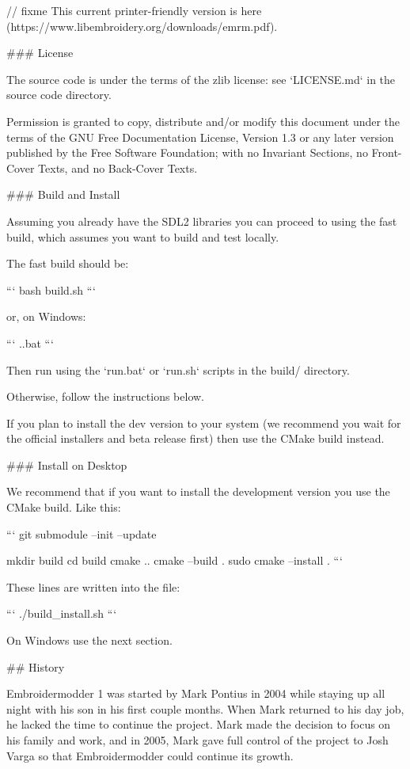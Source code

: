 // fixme
This current printer-friendly version
is here (https://www.libembroidery.org/downloads/emrm.pdf).

### License

The source code is under the terms of the zlib license: see `LICENSE.md`
in the source code directory.

Permission is granted to copy, distribute and/or modify this document
under the terms of the GNU Free Documentation License, Version 1.3
or any later version published by the Free Software Foundation;
with no Invariant Sections, no Front-Cover Texts, and no Back-Cover Texts.


### Build and Install

Assuming you already have the SDL2 libraries you can proceed to using the fast build, which
assumes you want to build and test locally.

The fast build should be:

```
bash build.sh
```

or, on Windows:

```
.\build.bat
```

Then run using the `run.bat` or `run.sh` scripts in the build/ directory.

Otherwise, follow the instructions below.

If you plan to install the dev version to your system (we recommend you wait
for the official installers and beta release first) then use the CMake build
instead.

### Install on Desktop

We recommend that if you want to install the development version you use the CMake build. Like
this:

```
git submodule --init --update

mkdir build
cd build
cmake ..
cmake --build .
sudo cmake --install .
```

These lines are written into the file:

```
./build_install.sh
```

On Windows use the next section.

## History

Embroidermodder 1 was started by Mark Pontius in 2004 while staying up all night
with his son in his first couple months. When Mark returned to his day job, he
lacked the time to continue the project. Mark made the decision to focus on his
family and work, and in 2005, Mark gave full control of the project to Josh
Varga so that Embroidermodder could continue its growth.

